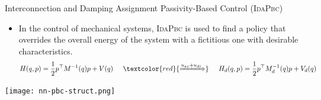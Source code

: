 \begin{frame}{Interconnection and Damping Assignment Passivity-Based Control (\textsc{IdaPbc})}
    \begin{itemize}
        \item In the control of mechanical systems, \textsc{IdaPbc} is used to find a
        policy that overrides the overall energy of the system with a fictitious one
        with desirable characteristics.
        \begin{align*}
            H(q, p) = \frac{1}{2} p^\top M^{-1}(q)p + V(q) \hspace{0.5cm} \textcolor{red}{\xRightarrow[]{u_{es} + u_{di}}} \hspace{0.5cm} H_d(q, p) = \frac{1}{2} p^\top M_d^{-1}(q)p + V_d(q) 
        \end{align*}
    \end{itemize}
    \texttt{[image: nn-pbc-struct.png]}
\end{frame}

